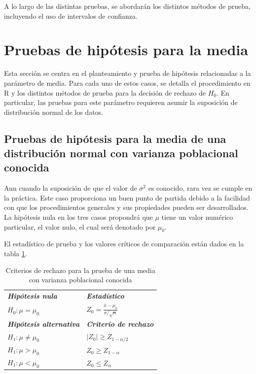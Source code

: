 \documentclass[
]{book}
\newcommand{\gt}{>}
\newcommand{\lt}{<}
\theoremstyle{definition}
\theoremstyle{definition}
\theoremstyle{definition}
\theoremstyle{definition}
\theoremstyle{remark}
\begin{document}
A lo largo de las distintas pruebas, se abordarán los distintos métodos de prueba, incluyendo el uso de intervalos de confianza.

\hypertarget{pruebas}{%
\section{Pruebas de hipótesis para la media}\label{pruebas}}

Esta sección se centra en el planteamiento y prueba de hipótesis relacionadas a la parámetro de media. Para cada uno de estos casos, se detalla el procedimiento en R y los distintos métodos de prueba para la decisión de rechazo de \(H_0\). En particular, las pruebas para este parámetro requieren asumir la suposición de distribución normal de los datos.

\hypertarget{pruebas-de-hipuxf3tesis-para-la-media-de-una-distribuciuxf3n-normal-con-varianza-poblacional-conocida}{%
\subsection*{Pruebas de hipótesis para la media de una distribución normal con varianza poblacional conocida}\label{pruebas-de-hipuxf3tesis-para-la-media-de-una-distribuciuxf3n-normal-con-varianza-poblacional-conocida}}

Aun cuando la suposición de que el valor de \(\sigma^2\) es conocido, rara vez se cumple en la práctica. Este caso proporciona un buen punto de partida debido a la facilidad con que los procedimientos generales y sus propiedades pueden ser desarrollados. La hipótesis nula en los tres casos propondrá que \(\mu\) tiene un valor numérico particular, el valor nulo, el cual será denotado por \(\mu_0\).

El estadístico de prueba y los valores críticos de comparación están dados en la tabla \ref{tab:unamedia1}.

\begin{table}[H]

\caption{\label{tab:unamedia1}Criterios de rechazo para la prueba de una media con varianza poblacional conocida}
\centering
\begin{tabular}[t]{ll}
\toprule
\em{\textbf{Hipótesis nula}} & \em{\textbf{Estadístico}}\\
$H_0: \mu = \mu_0$ & $Z_0 = \displaystyle\frac{\bar{x}-\mu_0}{\sigma/\sqrt{n}}$\\
\em{\textbf{Hipótesis alternativa}} & \em{\textbf{Criterio de rechazo}}\\
$H_1: \mu \neq \mu_0$ & $|Z_0| \geq Z_{1-\alpha/2}$\\
$H_1: \mu \gt \mu_0$ & $Z_0 \geq Z_{1-\alpha}$\\
\addlinespace
$H_1: \mu \lt \mu_0$ & $Z_0 \leq Z_{\alpha}$\\
\bottomrule
\end{tabular}
\end{table}
\end{document}
